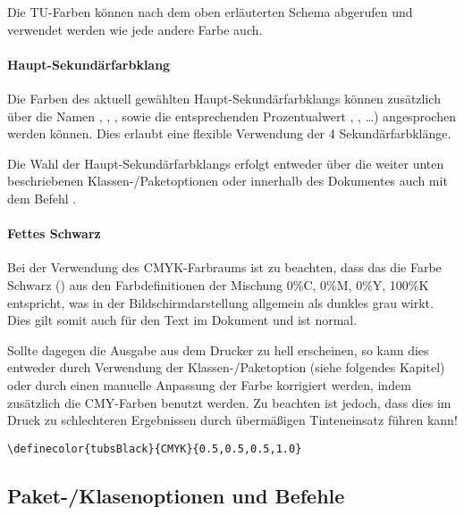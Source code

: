 
Die TU-Farben können nach dem oben erläuterten Schema abgerufen und verwendet
werden wie jede andere Farbe auch.

\paragraph{Haupt-Sekundärfarbklang}\label{sec:secondary}

Die Farben des aktuell gewählten Haupt-Sekundärfarbklangs können zusätzlich
über die Namen ,
, , sowie die
entsprechenden Prozentualwert ,
, \ldots) angesprochen werden können.
Dies erlaubt eine flexible Verwendung der 4 Sekundärfarbklänge.

Die Wahl der Haupt-Sekundärfarbklangs erfolgt entweder über die weiter
unten beschriebenen Klassen-/Paketoptionen oder innerhalb des Dokumentes auch
mit dem Befehl .

\paragraph{Fettes Schwarz}\label{sec:richblack}

  Bei der Verwendung des CMYK-Farbraums ist zu beachten,
  dass das die Farbe Schwarz ()
  aus den Farbdefinitionen der Mischung 0\%C, 0\%M, 0\%Y, 100\%K entspricht,
  was in der Bildschirmdarstellung allgemein als dunkles grau wirkt. Dies
  gilt somit auch für den Text im Dokument und ist normal.

  Sollte dagegen die Ausgabe aus dem Drucker zu hell erscheinen, so kann dies
  entweder durch Verwendung der Klassen-/Paketoption 
  (siehe folgendes Kapitel) oder durch einen manuelle Anpassung der Farbe
   korrigiert werden,
  indem zusätzlich die CMY-Farben benutzt werden.
  Zu beachten ist jedoch, dass dies im Druck zu schlechteren Ergebnissen
  durch übermäßigen Tinteneinsatz führen kann!
  
  \begin{example}
    \lstinline!\definecolor{tubsBlack}{CMYK}{0.5,0.5,0.5,1.0}!
  \end{example}


\subsection{Paket-/Klasenoptionen und Befehle}

